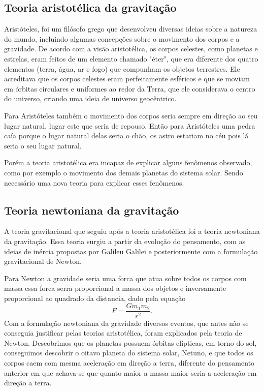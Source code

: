 \documentclass[
	article,			%
	11pt,				%
	twoside,			%
	a4paper,			%
	english,			%
	brazil,				%
	sumario=tradicional
	]{abntex2}
\begin{document}
\subsection{Teoria aristotélica da gravitação}

Aristóteles, foi um filósofo grego que desenvolveu diversas ideias sobre a natureza do mundo, incluindo algumas concepções sobre o movimento dos corpos e a gravidade. De acordo com a visão aristotélica, os corpos celestes, como planetas e estrelas, eram feitos de um elemento chamado "éter", que era diferente dos quatro elementos (terra, água, ar e fogo) que compunham os objetos terrestres. Ele acreditava que os corpos celestes eram perfeitamente esféricos e que se moviam em órbitas circulares e uniformes ao redor da Terra, que ele considerava o centro do universo, criando uma ideia de universo geocêntrico.

Para Aristóteles também o movimento dos corpos seria sempre em direção ao seu lugar natural, lugar este que seria de repouso. Então para Aristóteles uma pedra caía porque o lugar natural delas seria o chão, os astro estariam no céu pois lá seria o seu lugar natural.

Porém a teoria aristotélica era incapaz de explicar alguns fenômenos observado, como por exemplo o movimento dos demais planetas do sistema solar. Sendo necessário uma nova teoria para explicar esses fenômenos.

\subsection{Teoria newtoniana da gravitação}

A teoria gravitacional que seguiu após a teoria aristotélica foi a teoria newtoniana da gravitação. Essa teoria surgiu a partir da evolução do pensamento, com as ideias de inércia propostas por Galileu Galilei e posteriormente com a formulação gravitacional de Newton.

Para Newton a gravidade seria uma forca que atua sobre todos os corpos com massa essa forca serra proporcional a massa dos objetos e inversamente proporcional ao quadrado da distancia, dado pela equação
\begin{equation}
	F = \frac{Gm_1m_2}{r^2} .
\end{equation}
Com a formulação newtoniana da gravidade diversos eventos, que antes não se conseguia justificar pelas teorias aristotélica, foram explicados pela teoria de Newton. Descobrimos que os planetas possuem órbitas elípticas, em torno do sol, conseguimos descobrir o oitavo planeta do sistema solar, Netuno, e  que todos os corpos caem com mesma aceleração em direção a terra, diferente do pensamento anterior em que achava-se que quanto maior a massa maior seria a aceleração em direção a terra.
\end{document}
